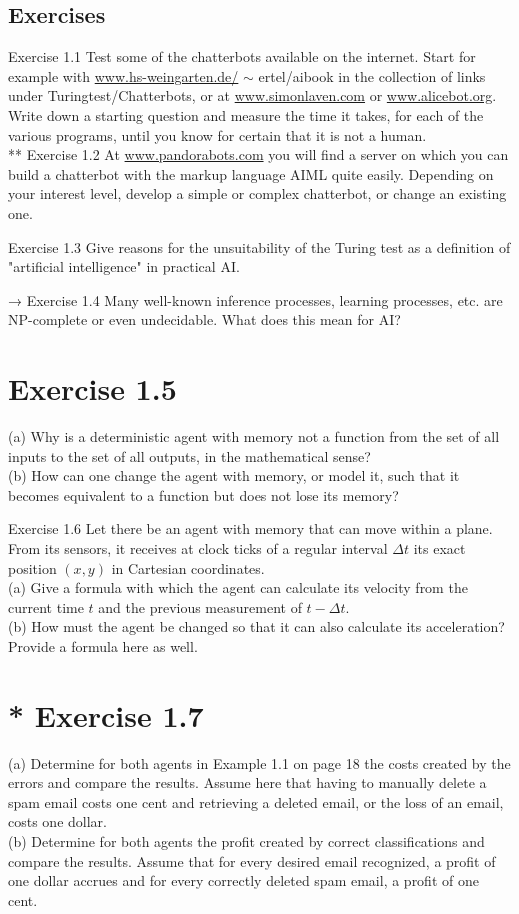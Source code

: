 \documentclass[10pt]{book}
\begin{document}
\subsection*{Exercises}
Exercise 1.1 Test some of the chatterbots available on the internet. Start for example with \href{http://www.hs-weingarten.de/}{www.hs-weingarten.de/} $\sim$ ertel/aibook in the collection of links under Turingtest/Chatterbots, or at \href{http://www.simonlaven.com}{www.simonlaven.com} or \href{http://www.alicebot.org}{www.alicebot.org}. Write down a starting question and measure the time it takes, for each of the various programs, until you know for certain that it is not a human.\\
** Exercise 1.2 At \href{http://www.pandorabots.com}{www.pandorabots.com} you will find a server on which you can build a chatterbot with the markup language AIML quite easily. Depending on your interest level, develop a simple or complex chatterbot, or change an existing one.

Exercise 1.3 Give reasons for the unsuitability of the Turing test as a definition of "artificial intelligence" in practical AI.


→ Exercise 1.4 Many well-known inference processes, learning processes, etc. are NP-complete or even undecidable. What does this mean for AI?

\section*{Exercise 1.5}
(a) Why is a deterministic agent with memory not a function from the set of all inputs to the set of all outputs, in the mathematical sense?\\
(b) How can one change the agent with memory, or model it, such that it becomes equivalent to a function but does not lose its memory?

Exercise 1.6 Let there be an agent with memory that can move within a plane. From its sensors, it receives at clock ticks of a regular interval $\Delta t$ its exact position $(x, y)$ in Cartesian coordinates.\\
(a) Give a formula with which the agent can calculate its velocity from the current time $t$ and the previous measurement of $t-\Delta t$.\\
(b) How must the agent be changed so that it can also calculate its acceleration? Provide a formula here as well.

\section*{* Exercise 1.7}
(a) Determine for both agents in Example 1.1 on page 18 the costs created by the errors and compare the results. Assume here that having to manually delete a spam email costs one cent and retrieving a deleted email, or the loss of an email, costs one dollar.\\
(b) Determine for both agents the profit created by correct classifications and compare the results. Assume that for every desired email recognized, a profit of one dollar accrues and for every correctly deleted spam email, a profit of one cent.
\end{document}
